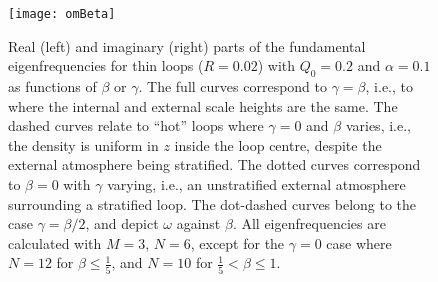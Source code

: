 \documentclass[12pt]{iopart}
\begin{document}

\begin{figure}[tbhp]
\begin{center}
\texttt{[image: omBeta]}
\caption{ Real (left) and imaginary (right) parts of the fundamental eigenfrequencies for thin loops ($R=0.02$) with $Q_0=0.2$ and $\alpha=0.1$ as functions of $\beta$ or $\gamma$. The full curves correspond to $\gamma=\beta$, i.e., to where the internal and external scale heights are the same. The dashed curves relate to ``hot'' loops where $\gamma=0$ and $\beta$ varies, i.e., the density is uniform in $z$ inside the loop centre, despite the external atmosphere being stratified. The dotted curves correspond to $\beta=0$ with $\gamma$ varying, i.e., an unstratified external atmosphere surrounding a stratified loop. The dot-dashed curves belong to the case $\gamma=\beta/2$, and depict $\omega$ against $\beta$. All eigenfrequencies are calculated with $M=3$, $N=6$, except for the $\gamma=0$ case where $N=12$ for $\beta\le\frac{1}{5}$, and $N=10$ for $\frac{1}{5}<\beta\le1$.}
\label{fig:omBeta}
\end{center}
\end{figure}
\end{document}
